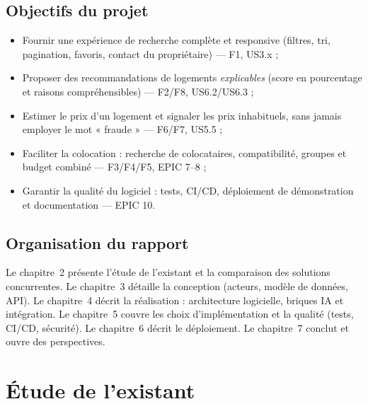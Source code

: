 \documentclass[11pt,a4paper]{report}
\begin{document}
\section{Objectifs du projet}
\begin{itemize}[leftmargin=*]
  \item Fournir une expérience de recherche complète et responsive (filtres, tri, pagination,
        favoris, contact du propriétaire) --- F1, US3.x ;
  \item Proposer des recommandations de logements \emph{explicables} (score en pourcentage et
        raisons compréhensibles) --- F2/F8, US6.2/US6.3 ;
  \item Estimer le prix d'un logement et signaler les prix inhabituels, sans jamais employer le
        mot « fraude » --- F6/F7, US5.5 ;
  \item Faciliter la colocation : recherche de colocataires, compatibilité, groupes et budget
        combiné --- F3/F4/F5, EPIC 7--8 ;
  \item Garantir la qualité du logiciel : tests, CI/CD, déploiement de démonstration et
        documentation --- EPIC 10.
\end{itemize}

\section{Organisation du rapport}
Le chapitre~2 présente l'étude de l'existant et la comparaison des solutions concurrentes. Le
chapitre~3 détaille la conception (acteurs, modèle de données, API). Le chapitre~4 décrit la
réalisation : architecture logicielle, briques IA et intégration. Le chapitre~5 couvre les choix
d'implémentation et la qualité (tests, CI/CD, sécurité). Le chapitre~6 décrit le déploiement. Le
chapitre~7 conclut et ouvre des perspectives.

\chapter{Étude de l'existant}
\end{document}

